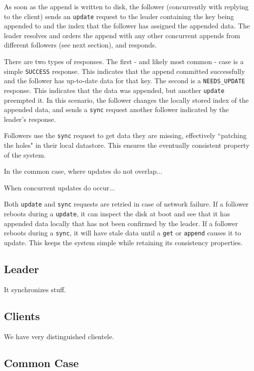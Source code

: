 \documentclass[11pt,english,twocolumn]{article}
\begin{document}
As soon as the append is written to disk, the follower (concurrently with
replying to the client) sends an \texttt{update} request to the leader
containing the key being appended to and the index that the follower has
assigned the appended data. The leader resolves and orders the append with any
other concurrent appends from different followers (see next section), and
responds.

There are two types of responses. The first - and likely most common - case
is a simple \texttt{SUCCESS} response. This indicates that the append committed
successfully and the follower has up-to-date data for that key. The second is a
\texttt{NEEDS\_UPDATE} response. This indicates that the data was appended, but
another \texttt{update} preempted it. In this scenario, the follower changes the
locally stored index of the appended data, and sends a \texttt{sync} request
another follower indicated by the leader's response.

Followers use the \texttt{sync} request to get data they are missing,
effectively ``patching the holes" in their local datastore. This ensures the
eventually consistent property of the system.

In the common case, where updates do not overlap...

When concurrent updates do occur...

Both \texttt{update} and \texttt{sync} requests are retried in case of network
failure. If a follower reboots during a \texttt{update}, it can inspect the disk
at boot and see that it has appended data locally that has not been confirmed by
the leader. If a follower reboots during a \texttt{sync}, it will have stale
data until a \texttt{get} or \texttt{append} causes it to update. This keeps the
system simple while retaining its consistency properties.

\subsection{Leader}
It synchronizes stuff.

\subsection{Clients}
We have very distinguished clientele.

\subsection{Common Case}
\end{document}
